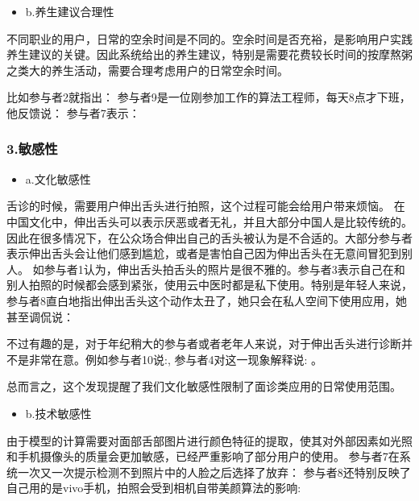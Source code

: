 \begin{itemize}
\item b.养生建议合理性
\end{itemize}

不同职业的用户，日常的空余时间是不同的。空余时间是否充裕，是影响用户实践养生建议的关键。因此系统给出的养生建议，特别是需要花费较长时间的按摩熬粥之类大的养生活动，需要合理考虑用户的日常空余时间。

比如参与者2就指出：
参与者9是一位刚参加工作的算法工程师，每天8点才下班，他反馈说： 参与者7表示：

\subsubsection{3.敏感性}

\begin{itemize}
\item a.文化敏感性
\end{itemize}


舌诊的时候，需要用户伸出舌头进行拍照，这个过程可能会给用户带来烦恼。
在中国文化中，伸出舌头可以表示厌恶或者无礼，并且大部分中国人是比较传统的。因此在很多情况下，在公众场合伸出自己的舌头被认为是不合适的。大部分参与者表示伸出舌头会让他们感到尴尬，或者是害怕自己因为伸出舌头在无意间冒犯到别人。
如参与者1认为，伸出舌头拍舌头的照片是很不雅的。参与者3表示自己在和别人拍照的时候都会感到紧张，使用云中医时都是私下使用。特别是年轻人来说，参与者8直白地指出伸出舌头这个动作太丑了，她只会在私人空间下使用应用，她甚至调侃说：

不过有趣的是，对于年纪稍大的参与者或者老年人来说，对于伸出舌头进行诊断并不是非常在意。例如参与者10说:, 参与者4对这一现象解释说: 。 

总而言之，这个发现提醒了我们文化敏感性限制了面诊类应用的日常使用范围。


\begin{itemize}
\item b.技术敏感性
\end{itemize}


由于模型的计算需要对面部舌部图片进行颜色特征的提取，使其对外部因素如光照和手机摄像头的质量会更加敏感，已经严重影响了部分用户的使用。
参与者7在系统一次又一次提示检测不到照片中的人脸之后选择了放弃：
参与者8还特别反映了自己用的是vivo手机，拍照会受到相机自带美颜算法的影响: 

